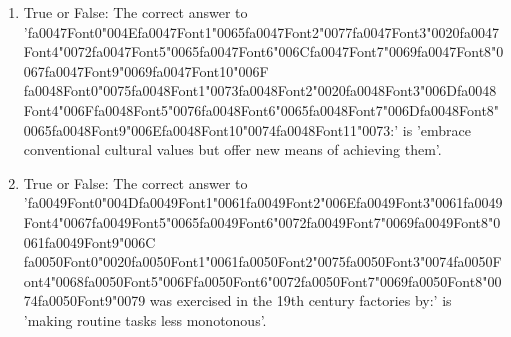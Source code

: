 \documentclass[12pt]{article}
\begin{document}
\begin{enumerate}[label=\arabic*.]
\item True or False: The correct answer to '{\csname fa0047Font0\endcsname\char"004E}{\csname fa0047Font1\endcsname\char"0065}{\csname fa0047Font2\endcsname\char"0077}{\csname fa0047Font3\endcsname\char"0020}{\csname fa0047Font4\endcsname\char"0072}{\csname fa0047Font5\endcsname\char"0065}{\csname fa0047Font6\endcsname\char"006C}{\csname fa0047Font7\endcsname\char"0069}{\csname fa0047Font8\endcsname\char"0067}{\csname fa0047Font9\endcsname\char"0069}{\csname fa0047Font10\endcsname\char"006F} {\csname fa0048Font0\endcsname\char"0075}{\csname fa0048Font1\endcsname\char"0073}{\csname fa0048Font2\endcsname\char"0020}{\csname fa0048Font3\endcsname\char"006D}{\csname fa0048Font4\endcsname\char"006F}{\csname fa0048Font5\endcsname\char"0076}{\csname fa0048Font6\endcsname\char"0065}{\csname fa0048Font7\endcsname\char"006D}{\csname fa0048Font8\endcsname\char"0065}{\csname fa0048Font9\endcsname\char"006E}{\csname fa0048Font10\endcsname\char"0074}{\csname fa0048Font11\endcsname\char"0073}:' is 'embrace conventional cultural values but offer new means of achieving them'.
\item True or False: The correct answer to '{\csname fa0049Font0\endcsname\char"004D}{\csname fa0049Font1\endcsname\char"0061}{\csname fa0049Font2\endcsname\char"006E}{\csname fa0049Font3\endcsname\char"0061}{\csname fa0049Font4\endcsname\char"0067}{\csname fa0049Font5\endcsname\char"0065}{\csname fa0049Font6\endcsname\char"0072}{\csname fa0049Font7\endcsname\char"0069}{\csname fa0049Font8\endcsname\char"0061}{\csname fa0049Font9\endcsname\char"006C} {\csname fa0050Font0\endcsname\char"0020}{\csname fa0050Font1\endcsname\char"0061}{\csname fa0050Font2\endcsname\char"0075}{\csname fa0050Font3\endcsname\char"0074}{\csname fa0050Font4\endcsname\char"0068}{\csname fa0050Font5\endcsname\char"006F}{\csname fa0050Font6\endcsname\char"0072}{\csname fa0050Font7\endcsname\char"0069}{\csname fa0050Font8\endcsname\char"0074}{\csname fa0050Font9\endcsname\char"0079} was exercised in the 19th century factories by:' is 'making routine tasks less monotonous'.

\end{enumerate}
\end{document}
